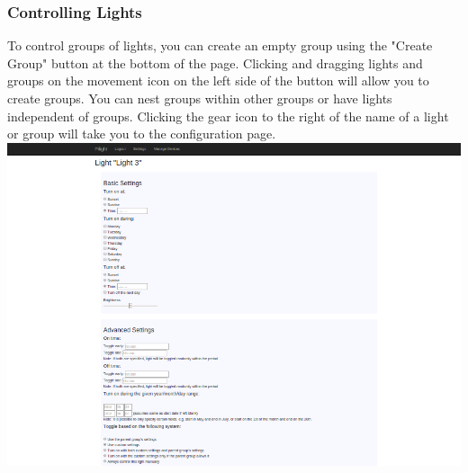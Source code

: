 \subsubsection{Controlling Lights}
To control groups of lights, you can create an empty group using the "Create Group" button at the bottom of the page. Clicking and dragging lights and groups on the movement icon on the left side of the button will allow you to create groups. You can nest groups within other groups or have lights independent of groups. Clicking the gear icon to the right of the name of a light or group will take you to the configuration page.\\
\includegraphics[width=1.0\textwidth]{advanced.png}\\
